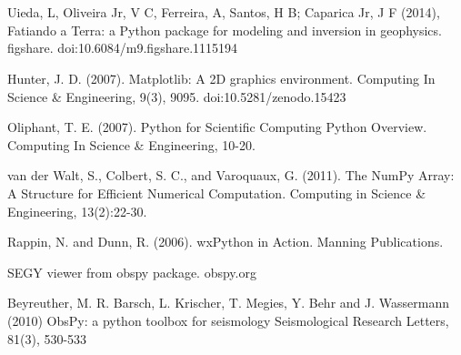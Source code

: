 \documentclass[a4paper,12pt,english]{sphinxmanual}
\begin{document}
\chapter{}
\label{\detokenize{tutorial::doc}}\label{\detokenize{tutorial:tutorial}}

\chapter{}
\label{\detokenize{contribute:contribute}}\label{\detokenize{contribute::doc}}\label{\detokenize{contribute:contibute}}

\chapter{}
\label{\detokenize{references:references}}\label{\detokenize{references::doc}}\label{\detokenize{references:id1}}

Uieda, L, Oliveira Jr, V C, Ferreira, A, Santos, H B; Caparica Jr, J F (2014), Fatiando a Terra: a Python package for
modeling and inversion in geophysics. figshare. doi:10.6084/m9.figshare.1115194


Hunter, J. D. (2007). Matplotlib: A 2D graphics environment. Computing In Science \& Engineering, 9(3),
90\textendash{}95. doi:10.5281/zenodo.15423


Oliphant, T. E. (2007). Python for Scientific Computing Python Overview. Computing In Science \& Engineering, 10-20.


van der Walt, S., Colbert, S. C., and Varoquaux, G. (2011). The NumPy Array: A Structure for Efficient
Numerical Computation. Computing in Science \& Engineering, 13(2):22-30.


Rappin, N. and Dunn, R. (2006). wxPython in Action. Manning Publications.


SEGY viewer from obspy package. obspy.org

Beyreuther, M. R. Barsch, L. Krischer, T. Megies, Y. Behr and J. Wassermann (2010) ObsPy: a python toolbox for
seismology Seismological Research Letters, 81(3), 530-533
\end{document}
